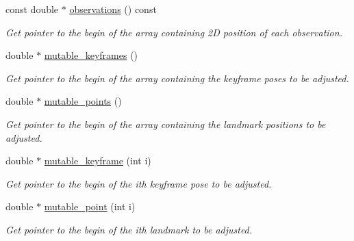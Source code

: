 \begin{DoxyCompactItemize}
const double $\ast$ \hyperlink{classBALProblem_a276ca464f09f2fe5a76e0c2bc0afe57f}{observations} () const
\begin{DoxyCompactList}\small\item\em Get pointer to the begin of the array containing 2D position of each observation. \end{DoxyCompactList}\item 
\mbox{\label{classBALProblem_a6f94a879ab1f8d53316ab01051b9512d}} 
double $\ast$ \hyperlink{classBALProblem_a6f94a879ab1f8d53316ab01051b9512d}{mutable\+\_\+keyframes} ()
\begin{DoxyCompactList}\small\item\em Get pointer to the begin of the array containing the keyframe poses to be adjusted. \end{DoxyCompactList}\item 
\mbox{\label{classBALProblem_aa17a635043ae62cf9707763e5a246803}} 
double $\ast$ \hyperlink{classBALProblem_aa17a635043ae62cf9707763e5a246803}{mutable\+\_\+points} ()
\begin{DoxyCompactList}\small\item\em Get pointer to the begin of the array containing the landmark positions to be adjusted. \end{DoxyCompactList}\item 
\mbox{\label{classBALProblem_a4cedeb4aef54242cfb0f7170db45f7d2}} 
double $\ast$ \hyperlink{classBALProblem_a4cedeb4aef54242cfb0f7170db45f7d2}{mutable\+\_\+keyframe} (int i)
\begin{DoxyCompactList}\small\item\em Get pointer to the begin of the ith keyframe pose to be adjusted. \end{DoxyCompactList}\item 
\mbox{\label{classBALProblem_a89c3d6afe28864900bd086a52c5277d6}} 
double $\ast$ \hyperlink{classBALProblem_a89c3d6afe28864900bd086a52c5277d6}{mutable\+\_\+point} (int i)
\begin{DoxyCompactList}\small\item\em Get pointer to the begin of the ith landmark to be adjusted. \end{DoxyCompactList}\item 
\mbox{\label{classBALProblem_ab9462d8a6cab6fe6ecc20e299048e611}} 

\end{DoxyCompactItemize}
